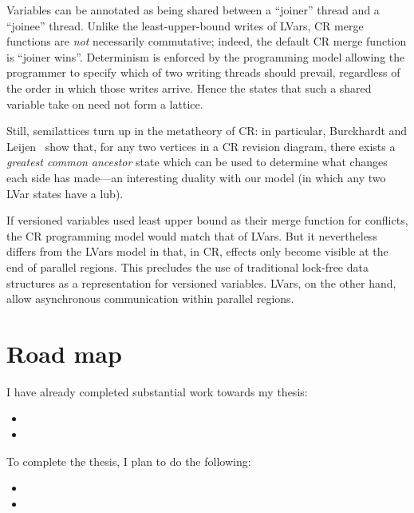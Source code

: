 \documentclass{article}
\begin{document}
Variables can be annotated as being shared between a ``joiner'' thread
and a ``joinee'' thread.  Unlike the least-upper-bound writes of
LVars, CR merge functions are \emph{not} necessarily commutative;
indeed, the default CR merge function is ``joiner wins''.  Determinism
is enforced by the programming model allowing the programmer to
specify which of two writing threads should prevail, regardless of the
order in which those writes arrive.  Hence the states that such a
shared variable take on need not form a lattice.

Still, semilattices turn up in the metatheory of CR: in particular,
Burckhardt and Leijen~\cite{semantics-concurrent-revisions} show that,
for any two vertices in a CR revision diagram, there exists a
\emph{greatest common ancestor} state which can be used to determine
what changes each side has made---an interesting duality with our
model (in which any two LVar states have a lub). 

If versioned variables used least upper bound as their merge function
for conflicts, the CR programming model would match that of LVars.    But it nevertheless
differs from the LVars model in that, in CR, effects only become
visible at the end of parallel regions. 
This precludes the use of traditional lock-free data structures as a
representation for versioned variables.  LVars, on the other hand,
allow asynchronous communication within parallel regions.

\section{Road map}

I have already completed substantial work towards my thesis:

\begin{itemize}
\item {}
\item {}
\end{itemize}
To complete the thesis, I plan to do the following:
\begin{itemize}
\item {}
\item {}
\end{itemize}



\end{document}
